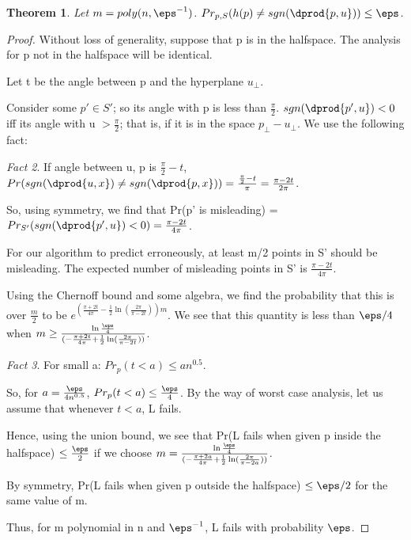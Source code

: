 \documentclass[10pt]{amsart}
\newtheorem{thm}{Theorem}[subsection]
\theoremstyle{remark}
\newtheorem{fact}[thm]{Fact}
\begin{document}
\begin{thm}
Let $m = poly(n, \eps^{-1})$. $Pr_{p, S}(h(p) \neq sgn(\dprod{p, u})) \leq \eps$.
\end{thm}
\begin{proof}
Without loss of generality, suppose that p is in the halfspace. The analysis for p not in the halfspace will be identical.

Let t be the angle between p and the hyperplane $u_{\perp}$.

Consider some $p' \in S'$; so its angle with p is less than $\frac{\pi}{2}$. $sgn(\dprod{p',u})<0$ iff its angle with u $> \frac{\pi}{2}$; that is, if it is in the space $p_{\perp} - u_{\perp}$. We use the following fact:
\begin{fact}
If angle between u, p is $\frac{\pi}{2} - t$, $Pr(sgn(\dprod{u,x}) \neq sgn(\dprod{p,x})) = \frac{\frac{\pi}{2} - t}{\pi} = \frac{\pi - 2t}{2\pi}$.
\end{fact}

So, using symmetry, we find that Pr(p' is misleading) = $Pr_{S'}(sgn(\dprod{p',u})<0) = \frac{\pi - 2t}{4\pi}$.

For our algorithm to predict erroneously, at least m/2 points in S' should be misleading.
The expected number of misleading points in S' is $\frac{\pi - 2t}{4\pi}$.

Using the Chernoff bound and some algebra, we find the probability that this is over $\frac{m}{2}$ to be $e^{(\frac{\pi + 2t}{4 \pi} - \frac{1}{2}\ln(\frac{2\pi}{\pi - 2t}))m}$. We see that this quantity is less than $\eps/4$ when $m \geq \frac{\ln \frac{\eps}{4}}{(-\frac{\pi + 2t}{4 \pi} + \frac{1}{2}\ln(\frac{2\pi}{\pi - 2t}))}$.

\begin{fact}
For small a: $Pr_{p}(t< a)\leq a n^{0.5}$.
\end{fact}

So, for $a = \frac{\eps}{4n^{0.5}}$, $Pr_{p}(t < a) \leq \frac{\eps}{4}$. By the way of worst case analysis, let us assume that whenever $t<a$, L fails.

Hence, using the union bound, we see that Pr(L fails when given p inside the halfspace) $\leq \frac{\eps}{2}$ if we choose $m = \frac{\ln \frac{\eps}{4}}{(-\frac{\pi + 2a}{4 \pi} + \frac{1}{2}\ln(\frac{2\pi}{\pi - 2a}))}$.

By symmetry, Pr(L fails when given p outside the halfspace) $\leq \eps/2$ for the same value of m.

Thus, for m polynomial in n and $\eps^{-1}$, L fails with probability $\eps$.
\end{proof}

% 
% 
\end{document}
